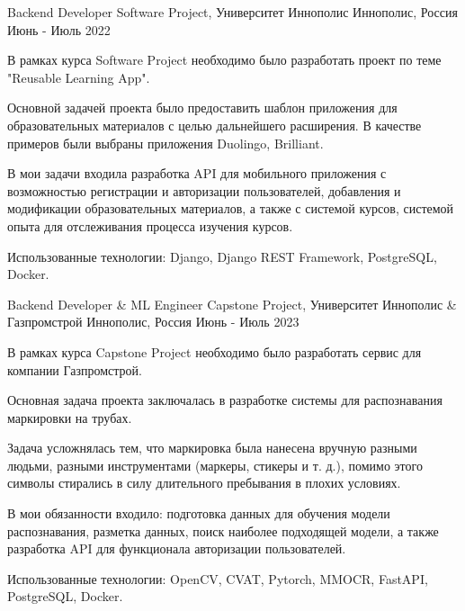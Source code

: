 \begin{cventries}
  \cventry
  {Backend Developer} %
  {Software Project, Университет Иннополис} %
  {Иннополис, Россия} %
  {Июнь - Июль 2022} %
  {
    \begin{cvitems} %
      \item {В рамках курса Software Project необходимо было разработать проект по теме "Reusable Learning App". }
      \item {Основной задачей проекта было предоставить шаблон приложения для образовательных материалов с целью дальнейшего расширения. В качестве примеров были выбраны приложения Duolingo, Brilliant. }
      \item {В мои задачи входила разработка API для мобильного приложения с возможностью регистрации и авторизации пользователей, добавления и модификации образовательных материалов, а также с системой курсов, системой опыта для отслеживания процесса изучения курсов. }
      \item {Использованные технологии: Django, Django REST Framework, PostgreSQL, Docker. }
    \end{cvitems}
  }

  \cventry
  {Backend Developer \& ML Engineer} %
  {Capstone Project, Университет Иннополис \& Газпромстрой} %
  {Иннополис, Россия} %
  {Июнь - Июль 2023} %
  {
    \begin{cvitems} %
      \item {В рамках курса Capstone Project необходимо было разработать сервис для компании Газпромстрой. }
      \item {Основная задача проекта заключалась в разработке системы для распознавания маркировки на трубах. }
      \item {Задача усложнялась тем, что маркировка была нанесена вручную разными людьми, разными инструментами (маркеры, стикеры и т. д.), помимо этого символы стирались в силу длительного пребывания в плохих условиях. }
      \item {В мои обязанности входило: подготовка данных для обучения модели распознавания, разметка данных, поиск наиболее подходящей модели, а также разработка API для функционала авторизации пользователей. }
      \item {Использованные технологии: OpenCV, CVAT, Pytorch, MMOCR, FastAPI, PostgreSQL, Docker. }
    \end{cvitems}
  }


\end{cventries}
